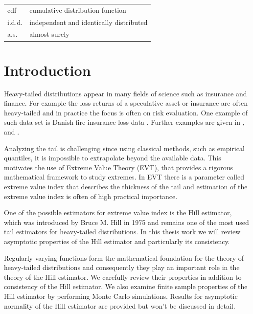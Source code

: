 \documentclass[english,12pt,a4paper,pdftex,sci,utf8]{aaltothesis} %
\begin{document}
\begin{tabular}{ll}
cdf         & cumulative distribution function \\
i.d.d.     & independent and identically distributed \\
a.s.         & almost surely\\
\end{tabular}


\cleardoublepage

\section{Introduction}

Heavy-tailed distributions appear in many fields of science such as insurance and finance. For example the loss returns of a speculative asset or insurance are often heavy-tailed and in practice the focus is often on risk evaluation. One example of such data set is Danish fire insurance loss data \cite{mcneil}  \cite{resnickFire}. Further examples are given in \cite{resnick}, \cite{deHaan} and \cite{embrechts}.

Analyzing the tail is challenging since using classical methods, such as empirical quantiles, it is impossible to extrapolate beyond the available data. This motivates the use of Extreme Value Theory (EVT), that provides a rigorous mathematical framework to study extremes. In EVT there is a parameter called extreme value index that describes the thickness of the tail and estimation of the extreme value index is often of high practical importance.

One of the possible estimators for extreme value index is the Hill estimator, which was introduced by Bruce M. Hill in 1975 \cite{hill} and remains one of the most used tail estimators for heavy-tailed distributions.
In this thesis work we will review asymptotic properties of the Hill estimator and particularly its consistency.

Regularly varying functions form the mathematical foundation for the theory of heavy-tailed distributions and consequently they play an important role in the theory of the Hill estimator. We carefully review their properties in addition to consistency of the Hill estimator. We also examine finite sample properties of the Hill estimator by performing Monte Carlo simulations. Results for asymptotic normality of the Hill estimator are provided but won’t be discussed in detail.
\end{document}

